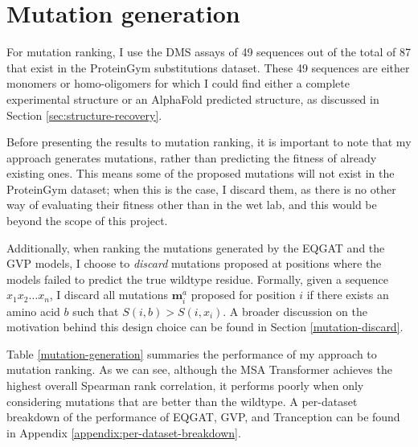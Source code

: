 \section{Mutation generation}
\label{sec:mutation-generation-results}
For mutation ranking, I use the DMS assays of 49 sequences out of the total of 87 that exist in the ProteinGym substitutions dataset. These 49 sequences are either monomers or homo-oligomers for which I could find either a complete experimental structure or an AlphaFold predicted structure, as discussed in Section \ref{sec:structure-recovery}.

Before presenting the results to mutation ranking, it is important to note that my approach generates mutations, rather than predicting the fitness of already existing ones. This means some of the proposed mutations will not exist in the ProteinGym dataset; when this is the case, I discard them, as there is no other way of evaluating their fitness other than in the wet lab, and this would be beyond the scope of this project.

Additionally, when ranking the mutations generated by the EQGAT and the GVP models, I choose to \textit{discard} mutations proposed at positions where the models failed to predict the true wildtype residue. Formally, given a sequence $x_1x_2\dots x_n$, I discard all mutations $\mathbf{m}_i^a$ proposed for position $i$ if there exists an amino acid $b$ such that $S(i, b) > S(i, x_i)$. A broader discussion on the motivation behind this design choice can be found in Section \ref{mutation-discard}. 

Table \ref{mutation-generation} summaries the performance of my approach to mutation ranking. As we can see, although the MSA Transformer \cite{tranception} achieves the highest overall Spearman rank correlation, it performs poorly when only considering mutations that are better than the wildtype. 
A per-dataset breakdown of the performance of EQGAT, GVP, and Tranception can be found in Appendix \ref{appendix:per-dataset-breakdown}.

